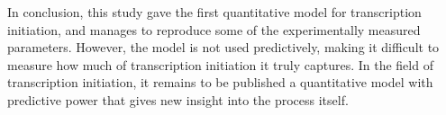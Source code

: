 In conclusion, this study gave the first quantitative model for transcription
initiation, and manages to reproduce some of the experimentally measured
parameters. However, the model is not used predictively, making it difficult to
measure how much of transcription initiation it truly captures. In the field of
transcription initiation, it remains to be published a quantitative model with
predictive power that gives new insight into the process itself.
